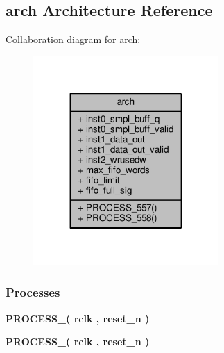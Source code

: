 \subsection{arch Architecture Reference}
\label{classpackets2data__top_1_1arch}


Collaboration diagram for arch\+:\nopagebreak
\begin{figure}[H]
\begin{center}
\leavevmode
\includegraphics[width=200pt]{d2/dda/classpackets2data__top_1_1arch__coll__graph}
\end{center}
\end{figure}
\subsubsection*{Processes}
 \begin{DoxyCompactItemize}
\item 
{\bf P\+R\+O\+C\+E\+S\+S\+\_}{\bfseries  ( {\bfseries {\bfseries {\bf rclk}} \textcolor{vhdlchar}{ }} , {\bfseries {\bfseries {\bf reset\+\_\+n}} \textcolor{vhdlchar}{ }} )}
\item 
{\bf P\+R\+O\+C\+E\+S\+S\+\_}{\bfseries  ( {\bfseries {\bfseries {\bf rclk}} \textcolor{vhdlchar}{ }} , {\bfseries {\bfseries {\bf reset\+\_\+n}} \textcolor{vhdlchar}{ }} )}
\end{DoxyCompactItemize}
